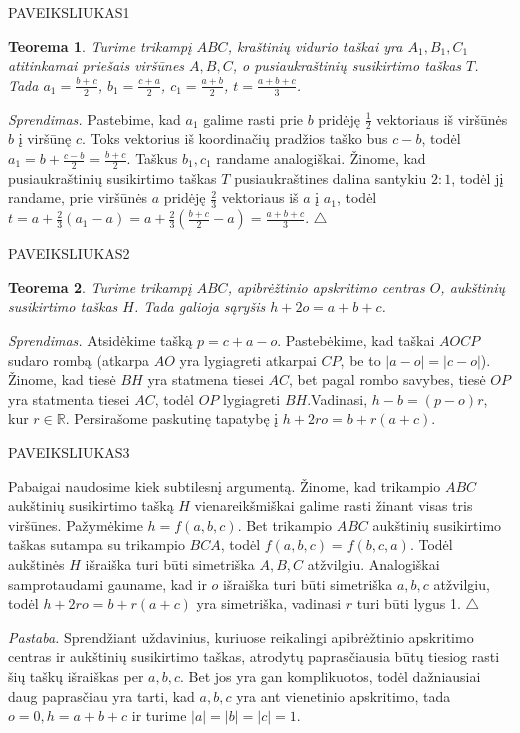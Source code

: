 \documentclass[11pt,a4paper,twoside]{book}
\newenvironment{sprendimas}{\noindent \textit{Sprendimas.}}{\hfill $\triangle$}
\newtheorem{thmnr}{Teorema}
\theoremstyle{definition} \newtheorem*{api}{Apibrėžimas}
\theoremstyle{remark} \newtheorem*{pastaba}{Pastaba}
\begin{document}
PAVEIKSLIUKAS1

\begin{thmnr}
Turime trikampį $ABC$, kraštinių vidurio taškai yra $A_1, B_1, C_1$ atitinkamai priešais viršūnes $A, B, C$, o pusiaukraštinių susikirtimo taškas $T$. Tada
$a_1 = \frac{b+c}{2}$,
$b_1 = \frac{c+a}{2}$,
$c_1 = \frac{a+b}{2}$,
$t = \frac{a+b+c}{3}$.
\end{thmnr}
\begin{sprendimas}
Pastebime, kad $a_1$ galime rasti prie $b$ pridėję $\frac{1}{2}$ vektoriaus iš viršūnės $b$ į viršūnę $c$. Toks vektorius iš koordinačių pradžios taško bus $c-b$, todėl $a_1 = b + \frac{c-b}{2}=\frac{b+c}{2}$. Taškus $b_1, c_1$ randame analogiškai.
Žinome, kad pusiaukraštinių susikirtimo taškas $T$ pusiaukraštines dalina santykiu $2:1$, todėl jį randame, prie viršūnės $a$ pridėję $\frac{2}{3}$ vektoriaus iš $a$ į $a_1$, todėl $t=a+\frac{2}{3}(a_1-a)=a+\frac{2}{3}(\frac{b+c}{2}-a)=\frac{a+b+c}{3}$.
\end{sprendimas}

PAVEIKSLIUKAS2




\begin{thmnr}
Turime trikampį $ABC$, apibrėžtinio apskritimo centras $O$, aukštinių susikirtimo taškas $H$. Tada galioja sąryšis
$h + 2o = a + b + c$.
\end{thmnr}
\begin{sprendimas}
Atsidėkime tašką $p=c+a-o$. Pastebėkime, kad taškai $AOCP$ sudaro rombą (atkarpa $AO$ yra lygiagreti atkarpai $CP$, be to $|a-o|=|c-o|$). Žinome, kad tiesė $BH$ yra statmena tiesei $AC$, bet pagal rombo savybes, tiesė $OP$ yra statmenta tiesei $AC$, todėl $OP$ lygiagreti $BH$.Vadinasi, $h-b=(p-o)r$, kur $r \in \mathbb{R}$. Persirašome paskutinę tapatybę į $h+2ro=b+r(a+c)$.

PAVEIKSLIUKAS3

Pabaigai naudosime kiek subtilesnį argumentą. Žinome, kad trikampio $ABC$ aukštinių susikirtimo tašką $H$ vienareikšmiškai galime rasti žinant visas tris viršūnes. Pažymėkime $h=f(a, b,c)$. Bet trikampio $ABC$ aukštinių susikirtimo taškas sutampa su trikampio $BCA$, todėl $f(a, b,c)=f(b,c,a)$. Todėl aukštinės $H$ išraiška turi būti simetriška $A, B, C$ atžvilgiu. Analogiškai samprotaudami gauname, kad ir $o$ išraiška turi būti simetriška $a, b, c$ atžvilgiu, todėl $h+2ro=b+r(a+c)$ yra simetriška, vadinasi $r$ turi būti lygus 1.
\end{sprendimas}

\textit {Pastaba.} Sprendžiant uždavinius, kuriuose reikalingi apibrėžtinio apskritimo centras ir aukštinių susikirtimo taškas, atrodytų paprasčiausia būtų tiesiog rasti šių taškų išraiškas per $a, b, c.$ Bet jos yra gan komplikuotos, todėl dažniausiai daug paprasčiau yra tarti, kad $a, b, c$ yra ant vienetinio apskritimo, tada $o=0, h=a+b+c$ ir turime $|a|=|b|=|c|=1$.
\end{document}
